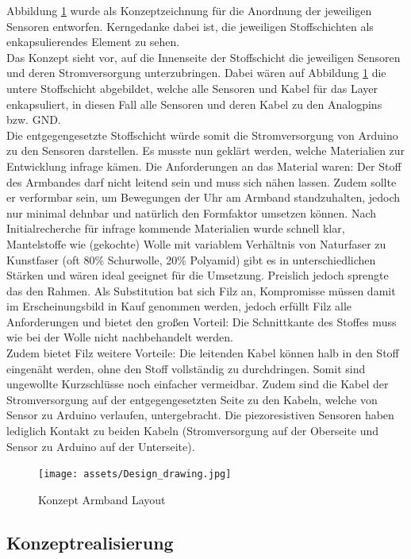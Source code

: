 \documentclass[11pt, a4paper]{article}
\begin{document}
Abbildung \ref{fig:concept_layout} wurde als Konzeptzeichnung für die Anordnung der jeweiligen Sensoren entworfen. 
Kerngedanke dabei ist, die jeweiligen Stoffschichten als enkapsulierendes Element zu sehen.\\
Das Konzept sieht vor, auf die Innenseite der Stoffschicht die jeweiligen Sensoren und deren Stromversorgung unterzubringen. 
Dabei wären auf Abbildung \ref{fig:concept_layout} die untere Stoffschicht abgebildet, welche alle Sensoren und Kabel für das Layer enkapsuliert, in diesen Fall alle Sensoren und deren Kabel zu den Analogpins bzw. GND.\\
Die entgegengesetzte Stoffschicht würde somit die Stromversorgung von Arduino zu den Sensoren darstellen. 
Es musste nun geklärt werden, welche Materialien zur Entwicklung infrage kämen. 
Die Anforderungen an das Material waren: Der Stoff des Armbandes darf nicht leitend sein und muss sich nähen lassen. Zudem sollte er verformbar sein, um Bewegungen der Uhr am Armband standzuhalten, jedoch nur minimal dehnbar und natürlich den Formfaktor umsetzen können. 
Nach Initialrecherche für infrage kommende Materialien wurde schnell klar, Mantelstoffe wie (gekochte) Wolle mit variablem Verhältnis von Naturfaser zu Kunstfaser (oft 80\% Schurwolle, 20\% Polyamid) gibt es in unterschiedlichen Stärken und wären ideal geeignet für die Umsetzung. 
Preislich jedoch sprengte das den Rahmen. Als Substitution bat sich Filz an, Kompromisse müssen damit im Erscheinungsbild in Kauf genommen werden, jedoch erfüllt Filz alle Anforderungen und bietet den großen Vorteil: Die Schnittkante des Stoffes muss wie bei der Wolle nicht nachbehandelt werden.\\
Zudem bietet Filz weitere Vorteile: Die leitenden Kabel können halb in den Stoff eingenäht werden, ohne den Stoff vollständig zu durchdringen. 
Somit sind ungewollte Kurzschlüsse noch einfacher vermeidbar. Zudem sind die Kabel der Stromversorgung auf der entgegengesetzten Seite zu den Kabeln, welche von Sensor zu Arduino verlaufen, untergebracht. Die piezoresistiven Sensoren haben lediglich Kontakt zu beiden Kabeln (Stromversorgung auf der Oberseite und Sensor zu Arduino auf der Unterseite).


\begin{figure}[h]
	\centering
	\texttt{[image: assets/Design\_drawing.jpg]}
	\caption{Konzept Armband Layout}
	\label{fig:concept_layout}
\end{figure}


\newpage

\subsection{Konzeptrealisierung}
\label{sec:hw_proc_realisation}
\end{document}
